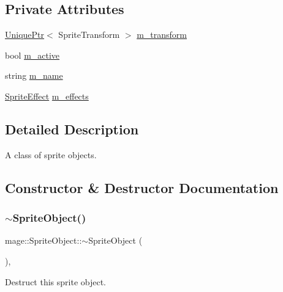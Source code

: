 \subsection*{Private Attributes}
\begin{DoxyCompactItemize}
\item 
\hyperlink{namespacemage_a3316d7143a973e37adf1110f2e80ca31}{Unique\+Ptr}$<$ Sprite\+Transform $>$ \hyperlink{classmage_1_1_sprite_object_a9523ae6f081a8fde3cbb3558f6e327da}{m\+\_\+transform}
\item 
bool \hyperlink{classmage_1_1_sprite_object_a6694bb9cade83917202cf9ca6d359e81}{m\+\_\+active}
\item 
string \hyperlink{classmage_1_1_sprite_object_a6f2a859e40ed391909bb4c87a8b74480}{m\+\_\+name}
\item 
\hyperlink{namespacemage_a9cfe18123066ba4236f548f9de75d881}{Sprite\+Effect} \hyperlink{classmage_1_1_sprite_object_a270f73b8d316f72c4228854d08a6d2ea}{m\+\_\+effects}
\end{DoxyCompactItemize}


\subsection{Detailed Description}
A class of sprite objects. 

\subsection{Constructor \& Destructor Documentation}
\hypertarget{classmage_1_1_sprite_object_aad4d1472cb468d8c19b61ab030332ceb}{}\label{classmage_1_1_sprite_object_aad4d1472cb468d8c19b61ab030332ceb} 
\subsubsection{\texorpdfstring{$\sim$\+Sprite\+Object()}{~SpriteObject()}}
{\footnotesize\ttfamily mage\+::\+Sprite\+Object\+::$\sim$\+Sprite\+Object (\begin{DoxyParamCaption}{ }\end{DoxyParamCaption})\hspace{0.3cm}{\ttfamily [virtual]}, {\ttfamily [default]}}

Destruct this sprite object. \hypertarget{classmage_1_1_sprite_object_af68fccf1e8a51f5b4a99a48dfb515f65}{}\label{classmage_1_1_sprite_object_af68fccf1e8a51f5b4a99a48dfb515f65} 
